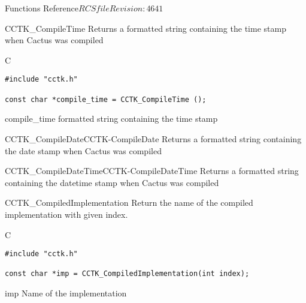 \begin{cactuspart}{ Functions Reference}{$RCSfile$}{$Revision: 4641 $}
\begin{FunctionDescription}{CCTK\_CompileTime}
\label{CCTK-CompileTime}
Returns a formatted string containing the time stamp when Cactus was compiled

\begin{SynopsisSection}
\begin{Synopsis}{C}
\begin{verbatim}
#include "cctk.h"

const char *compile_time = CCTK_CompileTime ();
\end{verbatim}
\end{Synopsis}
\end{SynopsisSection}

\begin{ResultSection}
\begin{Result}{compile\_time}
formatted string containing the time stamp
\end{Result}
\end{ResultSection}

\begin{SeeAlsoSection}
\begin{SeeAlso2}{CCTK\_CompileDate}{CCTK-CompileDate}
  Returns a formatted string containing the date stamp when Cactus was compiled
\end{SeeAlso2}
\begin{SeeAlso2}{CCTK\_CompileDateTime}{CCTK-CompileDateTime}
  Returns a formatted string containing the datetime stamp when Cactus was compiled
\end{SeeAlso2}
\end{SeeAlsoSection}
\end{FunctionDescription}


\begin{FunctionDescription}{CCTK\_CompiledImplementation}
\label{CCTK-CompiledImplementation}
Return the name of the compiled implementation with given index.

\begin{SynopsisSection}
\begin{Synopsis}{C}
\begin{verbatim}
#include "cctk.h"

const char *imp = CCTK_CompiledImplementation(int index);
\end{verbatim}
\end{Synopsis}
\end{SynopsisSection}

\begin{ResultSection}
\begin{Result}{imp}
Name of the implementation
\end{Result}
\end{ResultSection}


\end{FunctionDescription}
\end{cactuspart}
